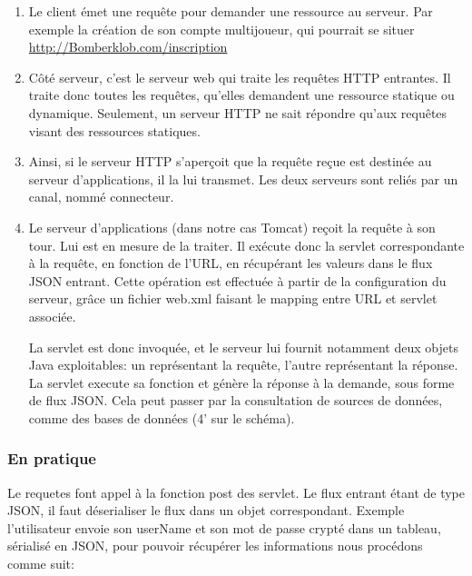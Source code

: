 		\begin{enumerate}

			\item 
					Le client émet une requête pour demander une
					ressource au serveur. Par exemple la création de son compte multijoueur,
					qui pourrait se situer \url{http://Bomberklob.com/inscription}
			\item
					Côté serveur, c'est le serveur web qui traite les
					requêtes HTTP entrantes. Il traite donc toutes les requêtes, qu'elles
					demandent une ressource statique ou dynamique. Seulement, un serveur HTTP
					ne sait répondre qu'aux requêtes visant des ressources statiques.

			\item 
					Ainsi, si le serveur HTTP s'aperçoit que la requête reçue est destinée
					au serveur d'applications, il la lui transmet. Les deux serveurs sont
					reliés par un canal, nommé connecteur.
		
			\item
					Le serveur d'applications (dans notre cas Tomcat) reçoit la requête à
					son tour. Lui est en mesure de la traiter. Il exécute donc la servlet
					correspondante à la requête, en fonction de l'URL, en récupérant les
					valeurs dans le flux JSON entrant. Cette opération est effectuée à partir
					de la configuration du serveur, grâce un fichier web.xml faisant le mapping
					entre URL et servlet associée.
		
					La servlet est donc invoquée, et le serveur lui fournit notamment deux
					objets Java exploitables: un représentant la requête, l'autre représentant
					la réponse. La servlet execute sa fonction et génère la réponse à la
					demande, sous forme de flux JSON. Cela peut passer par la consultation de
					sources de données, comme des bases de données (4' sur le schéma).		
		
		\end{enumerate}
		
		
	\subsubsection{En pratique}
		
		Le requetes font appel à la fonction post des servlet. Le flux entrant étant
		de type JSON, il faut déserialiser le flux dans un objet correspondant. Exemple
		l'utilisateur envoie son userName et son mot de passe crypté dans un tableau,
		sérialisé en JSON, pour pouvoir récupérer les informations nous procédons
		comme suit: 
		
